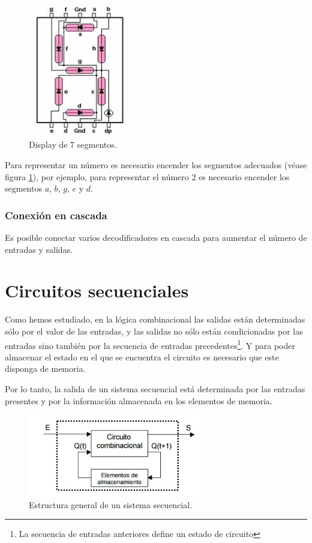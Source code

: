 \documentclass[a4paper, 11pt, titlepage]{article}
\begin{document}
			\begin{figure}[htp]
				\centering
				\includegraphics[width=0.4\textwidth]{resources/7segmentos.jpg}
				\caption{Display de 7 segmentos.}
				\label{7segmentos}
			\end{figure}

			Para representar un número es necesario encender los segmentos adecuados (véase figura 
			\ref{7segmentos}), por ejemplo, para representar el número 2 es necesario encender los 
			segmentos $a$, $b$, $g$, $e$ y $d$.

		\subsubsection{Conexión en cascada}

			Es posible conectar varios decodificadores en cascada para aumentar el número de entradas y 
			salidas.
	
\section{Circuitos secuenciales}

	Como hemos estudiado, en la lógica combinacional las salidas están determinadas sólo por el valor de las 
	entradas, y las salidas no sólo están condicionadas por las entradas sino también por la secuencia de 
	entradas precedentes\footnote{La secuencia de entradas anteriores define un estado de circuito}. Y para 
	poder almacenar el estado en el que se encuentra el circuito es necesario que este disponga de memoria.

	Por lo tanto, la salida de un sistema secuencial está determinada por las entradas presentes y por la 
	información almacenada en los elementos de memoria.

	\begin{figure}[htp]
		\centering
		\includegraphics[width=0.7\textwidth]{resources/circuitosecuencial.jpg}
		\caption{Estructura general de un sistema secuencial.}
		\label{circuitosecuencial}
	\end{figure}
\end{document}
